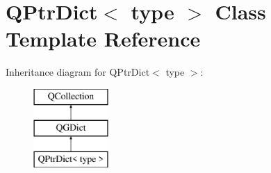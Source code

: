 \hypertarget{class_q_ptr_dict}{}\section{Q\+Ptr\+Dict$<$ type $>$ Class Template Reference}
\label{class_q_ptr_dict}
Inheritance diagram for Q\+Ptr\+Dict$<$ type $>$\+:\begin{figure}[H]
\begin{center}
\leavevmode
\includegraphics[height=3.000000cm]{class_q_ptr_dict}
\end{center}
\end{figure}
